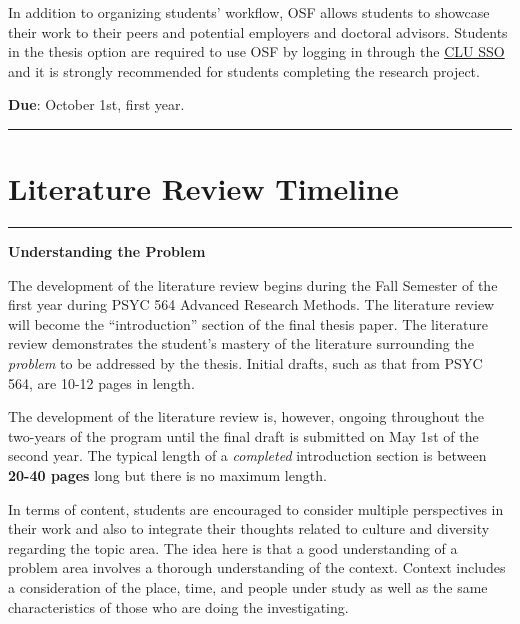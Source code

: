 \documentclass[openany]{book}
\begin{document}
In addition to organizing students' workflow, OSF allows students to showcase their work to their peers and potential employers and doctoral advisors. Students in the thesis option are required to use OSF by logging in through the \href{https://accounts.osf.io/login?campaign=institution\&service=https\%3A\%2F\%2Fosf.io\%2Flogin\%2F\%3Fnext\%3Dhttps\%253A\%252F\%252Fosf.io\%252F}{CLU SSO} and it is strongly recommended for students completing the research project.

\textbf{Due}: October 1st, first year.

\begin{center}\rule{0.5\linewidth}{0.5pt}\end{center}

\hypertarget{litreview}{%
\section{Literature Review Timeline}\label{litreview}}

\begin{center}\rule{0.5\linewidth}{0.5pt}\end{center}

\textbf{Understanding the Problem}

The development of the literature review begins during the Fall Semester of the first year during PSYC 564 Advanced Research Methods. The literature review will become the ``introduction'' section of the final thesis paper. The literature review demonstrates the student's mastery of the literature surrounding the \emph{problem} to be addressed by the thesis. Initial drafts, such as that from PSYC 564, are 10-12 pages in length.

The development of the literature review is, however, ongoing throughout the two-years of the program until the final draft is submitted on May 1st of the second year. The typical length of a \emph{completed} introduction section is between \textbf{20-40 pages} long but there is no maximum length.

In terms of content, students are encouraged to consider multiple perspectives in their work and also to integrate their thoughts related to culture and diversity regarding the topic area. The idea here is that a good understanding of a problem area involves a thorough understanding of the context. Context includes a consideration of the place, time, and people under study as well as the same characteristics of those who are doing the investigating.
\end{document}

